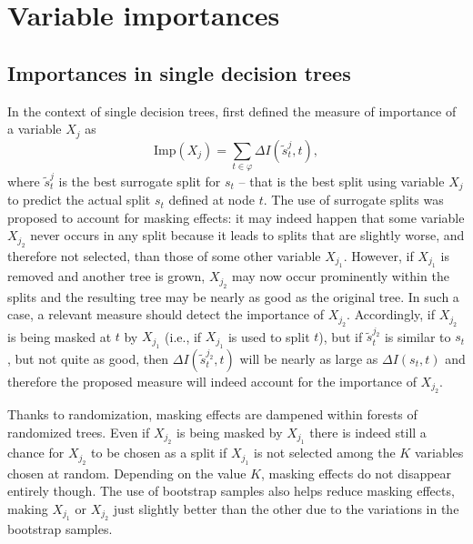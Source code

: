 

\section{Variable importances}
\label{sec:6:importances}

\subsection{Importances in single decision trees}

In the context of single decision trees, \cite{breiman:1984} first defined
the measure of importance of a variable $X_j$ as
\begin{equation}
\text{Imp}(X_j) = \sum_{t\in \varphi} \Delta I(\tilde{s}^j_t, t),
\end{equation}
where $\tilde{s}^j_t$ is the best surrogate split
for $s_t$ -- that is the best split using variable $X_j$ to predict the actual
split $s_t$ defined at node $t$. The use of surrogate splits was proposed to
account for masking effects: it may indeed happen that some variable $X_{j_2}$
never occurs in any split because it leads to splits that are slightly worse,
and therefore not selected, than those of some other variable $X_{j_1}$.
However, if $X_{j_1}$ is removed and another tree is grown, $X_{j_2}$ may now
occur prominently within the splits and the resulting tree may be nearly as good
as the original tree. In such a case, a relevant measure should detect the
importance of $X_{j_2}$. Accordingly, if $X_{j_2}$ is being masked at $t$ by
$X_{j_1}$ (i.e., if $X_{j_1}$ is used to split $t$), but if $\tilde{s}^{j_2}_t$ is similar to
$s_t$, but not quite as good, then $\Delta I(\tilde{s}^{j_2}_t, t)$ will be
nearly as large as $\Delta I(s_t, t)$ and therefore the proposed measure will
indeed account for the importance of $X_{j_2}$.

Thanks to randomization, masking effects are dampened within forests of
randomized trees. Even if $X_{j_2}$ is being masked by $X_{j_1}$ there is indeed
still a chance for $X_{j_2}$ to be chosen as a split if $X_{j_1}$ is not
selected among the $K$ variables chosen at random. Depending on the value $K$,
masking effects do not disappear entirely though. The use of bootstrap samples
also helps reduce masking effects, making $X_{j_1}$ or $X_{j_2}$ just slightly
better than the other due to the variations in the bootstrap samples.

